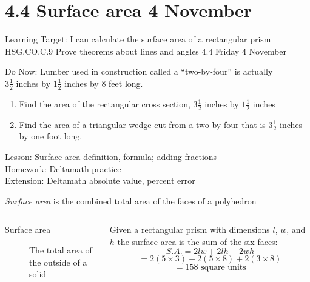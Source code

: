 \section{4.4 Surface area \hfill 4 November \,}
  \begin{frame}{Learning Target: I can calculate the surface area of a rectangular prism}
    {HSG.CO.C.9 Prove theorems about lines and angles  \hfill \alert{4.4 Friday 4 November}}
    \begin{block}{Do Now: Lumber used in construction called a ``two-by-four'' is actually \\
      $3 \frac{1}{2}$ inches by $1 \frac{1}{2}$ inches by 8 feet long.}
      \begin{enumerate}
        \item Find the area of the rectangular cross section, $3 \frac{1}{2}$ inches by $1 \frac{1}{2}$ inches
        \item Find the area of a triangular wedge cut from a two-by-four that is $3 \frac{1}{2}$ inches by one foot long.
      \end{enumerate}
    \end{block}
      Lesson: Surface area definition, formula; adding fractions \\
      Homework: Deltamath practice \\
      Extension: Deltamath absolute value, percent error
  \end{frame}

\begin{frame}{\emph{Surface area} is the combined total area of the faces of a polyhedron}
  \begin{columns}
    \begin{description}
      \item[Surface area] The total area of the outside of a solid
    \end{description}
    Given a rectangular prism with dimensions $l$, $w$, and $h$ the surface area is the sum of the six faces:
      $$S.A. = 2lw + 2lh + 2wh$$
      $$ = 2(5 \times 3) + 2(5 \times 8) + 2(3 \times 8)$$
      $$ = 158 \text{ square units} $$
  \end{columns} \vspace{0.5cm}
\end{frame}

